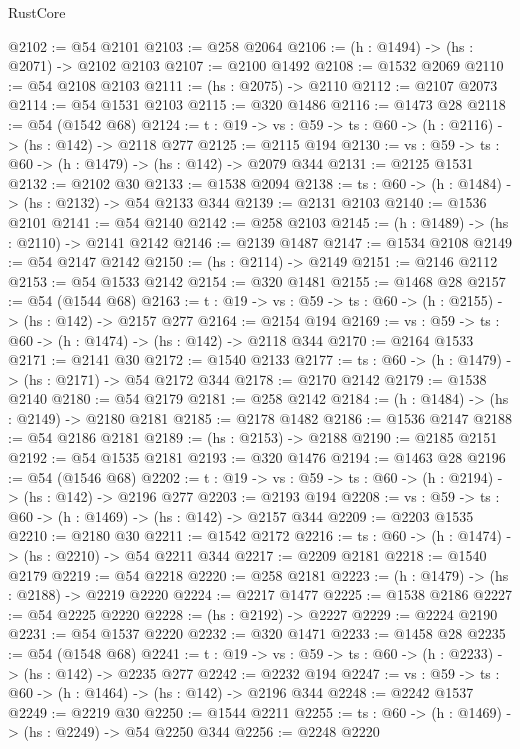 \begin{lexlean}{RustCore}
\begin{coremodule}
@2102 := @54 @2101
@2103 := @258 @2064
@2106 := (h : @1494) -> (hs : @2071) -> @2102 @2103
@2107 := @2100 @1492
@2108 := @1532 @2069
@2110 := @54 @2108 @2103
@2111 := (hs : @2075) -> @2110
@2112 := @2107 @2073
@2114 := @54 @1531 @2103
@2115 := @320 @1486
@2116 := @1473 @28
@2118 := @54 (@1542 @68)
@2124 := {t : @19} -> {vs : @59} -> {ts : @60} -> (h : @2116) -> (hs : @142) -> @2118 @277
@2125 := @2115 @194
@2130 := {vs : @59} -> {ts : @60} -> (h : @1479) -> (hs : @142) -> @2079 @344
@2131 := @2125 @1531
@2132 := @2102 @30
@2133 := @1538 @2094
@2138 := {ts : @60} -> (h : @1484) -> (hs : @2132) -> @54 @2133 @344
@2139 := @2131 @2103
@2140 := @1536 @2101
@2141 := @54 @2140
@2142 := @258 @2103
@2145 := (h : @1489) -> (hs : @2110) -> @2141 @2142
@2146 := @2139 @1487
@2147 := @1534 @2108
@2149 := @54 @2147 @2142
@2150 := (hs : @2114) -> @2149
@2151 := @2146 @2112
@2153 := @54 @1533 @2142
@2154 := @320 @1481
@2155 := @1468 @28
@2157 := @54 (@1544 @68)
@2163 := {t : @19} -> {vs : @59} -> {ts : @60} -> (h : @2155) -> (hs : @142) -> @2157 @277
@2164 := @2154 @194
@2169 := {vs : @59} -> {ts : @60} -> (h : @1474) -> (hs : @142) -> @2118 @344
@2170 := @2164 @1533
@2171 := @2141 @30
@2172 := @1540 @2133
@2177 := {ts : @60} -> (h : @1479) -> (hs : @2171) -> @54 @2172 @344
@2178 := @2170 @2142
@2179 := @1538 @2140
@2180 := @54 @2179
@2181 := @258 @2142
@2184 := (h : @1484) -> (hs : @2149) -> @2180 @2181
@2185 := @2178 @1482
@2186 := @1536 @2147
@2188 := @54 @2186 @2181
@2189 := (hs : @2153) -> @2188
@2190 := @2185 @2151
@2192 := @54 @1535 @2181
@2193 := @320 @1476
@2194 := @1463 @28
@2196 := @54 (@1546 @68)
@2202 := {t : @19} -> {vs : @59} -> {ts : @60} -> (h : @2194) -> (hs : @142) -> @2196 @277
@2203 := @2193 @194
@2208 := {vs : @59} -> {ts : @60} -> (h : @1469) -> (hs : @142) -> @2157 @344
@2209 := @2203 @1535
@2210 := @2180 @30
@2211 := @1542 @2172
@2216 := {ts : @60} -> (h : @1474) -> (hs : @2210) -> @54 @2211 @344
@2217 := @2209 @2181
@2218 := @1540 @2179
@2219 := @54 @2218
@2220 := @258 @2181
@2223 := (h : @1479) -> (hs : @2188) -> @2219 @2220
@2224 := @2217 @1477
@2225 := @1538 @2186
@2227 := @54 @2225 @2220
@2228 := (hs : @2192) -> @2227
@2229 := @2224 @2190
@2231 := @54 @1537 @2220
@2232 := @320 @1471
@2233 := @1458 @28
@2235 := @54 (@1548 @68)
@2241 := {t : @19} -> {vs : @59} -> {ts : @60} -> (h : @2233) -> (hs : @142) -> @2235 @277
@2242 := @2232 @194
@2247 := {vs : @59} -> {ts : @60} -> (h : @1464) -> (hs : @142) -> @2196 @344
@2248 := @2242 @1537
@2249 := @2219 @30
@2250 := @1544 @2211
@2255 := {ts : @60} -> (h : @1469) -> (hs : @2249) -> @54 @2250 @344
@2256 := @2248 @2220

\end{coremodule}
\end{lexlean}
